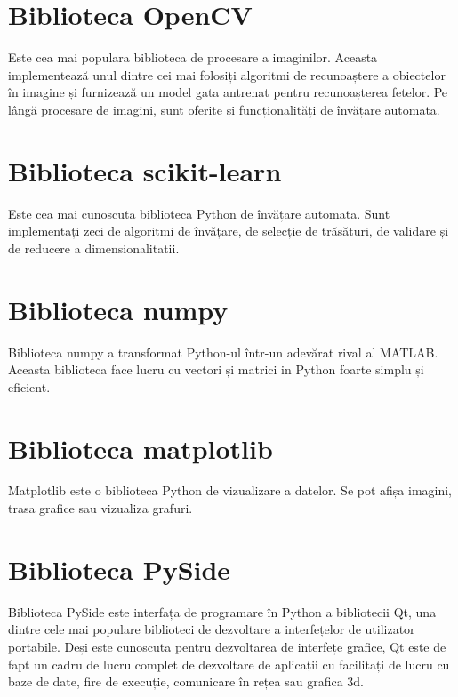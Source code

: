 \section{Biblioteca OpenCV}

Este cea mai populara biblioteca de procesare a imaginilor. Aceasta implementează unul dintre cei mai folosiți algoritmi de recunoaștere a obiectelor în imagine și furnizează un model gata antrenat pentru recunoașterea fetelor. Pe lângă procesare de imagini, sunt oferite și funcționalități de învățare automata.

\section{Biblioteca scikit-learn}

Este cea mai cunoscuta biblioteca Python de învățare automata. Sunt implementați zeci de algoritmi de învățare, de selecție de trăsături, de validare și de reducere a dimensionalitatii.


\section{Biblioteca numpy}

Biblioteca numpy a transformat Python-ul într-un adevărat rival al MATLAB.
Aceasta biblioteca face lucru cu vectori și matrici in Python foarte simplu și eficient.


\section{Biblioteca matplotlib}

Matplotlib este o biblioteca Python de vizualizare a datelor. Se pot afișa imagini, trasa grafice sau vizualiza grafuri.

\section{Biblioteca PySide}

Biblioteca PySide este interfața de programare în Python a bibliotecii Qt, una dintre cele mai populare biblioteci de dezvoltare a interfețelor de utilizator portabile. 
Deși este cunoscuta pentru dezvoltarea de interfețe grafice, Qt este de fapt un cadru de lucru complet de dezvoltare de aplicații cu facilitați de lucru cu baze de date, fire de execuție, comunicare în rețea sau grafica 3d.
